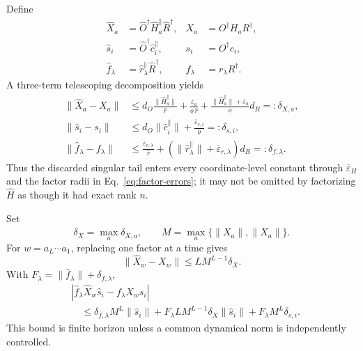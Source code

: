 \documentclass[aps,prl,onecolumn,superscriptaddress,nofootinbib]{revtex4-2}
\newcommand{\eps}{\varepsilon}
\begin{document}
Define
\begin{align}
 \widehat X_a&=\widehat O^\dagger\widehat H_a^{\parallel}\widehat R^\dagger,
 &X_a&=O^\dagger H_aR^\dagger,\nonumber\\
 \widehat s_i&=\widehat O^\dagger\widehat c_i^{\parallel},
 &s_i&=O^\dagger c_i,\nonumber\\
 \widehat f_\lambda&=\widehat r_\lambda^{\parallel}\widehat R^\dagger,
 &f_\lambda&=r_\lambda R^\dagger.
 \label{eq:truncated-reconstruction}
\end{align}
A three-term telescoping decomposition yields
\begin{align}
 \|\widehat X_a-X_a\|
 &\le d_O\frac{\|\widehat H_a^{\parallel}\|}{\widehat r}
 +\frac{\overline\eps_a}{\underline o\,\widehat r}
 +\frac{\|\widehat H_a^{\parallel}\|+\overline\eps_a}{\underline o}d_R
 =:\delta_{X,a},
 \label{eq:shift-error}\\
 \|\widehat s_i-s_i\|
 &\le d_O\|\widehat c_i^{\parallel}\|
 +\frac{\overline\eps_{c,i}}{\underline o}
 =:\delta_{s,i},
 \label{eq:seed-error}\\
 \|\widehat f_\lambda-f_\lambda\|
 &\le\frac{\overline\eps_{r,\lambda}}{\widehat r}
 +(\|\widehat r_\lambda^{\parallel}\|+\overline\eps_{r,\lambda})d_R
 =:\delta_{f,\lambda}.
 \label{eq:readout-error}
\end{align}
Thus the discarded singular tail enters every coordinate-level constant through $\overline\eps_H$ and the factor radii in Eq.~\eqref{eq:factor-errors}; it may not be omitted by factorizing $\widehat H$ as though it had exact rank $n$.

Set
\begin{equation}
 \delta_X=\max_a\delta_{X,a},
 \qquad
 M=\max_a\{\|X_a\|,\|\widehat X_a\|\}.
 \label{eq:MX}
\end{equation}
For $w=a_L\cdots a_1$, replacing one factor at a time gives
\begin{equation}
 \|\widehat X_w-X_w\|\le L M^{L-1}\delta_X.
 \label{eq:word-telescope}
\end{equation}
With $F_\lambda=\|\widehat f_\lambda\|+\delta_{f,\lambda}$,
\begin{align}
 &|\widehat f_\lambda\widehat X_w\widehat s_i-f_\lambda X_ws_i|\nonumber\\
 &\quad\le
 \delta_{f,\lambda}M^L\|\widehat s_i\|
 +F_\lambda L M^{L-1}\delta_X\|\widehat s_i\|
 +F_\lambda M^L\delta_{s,i}.
 \label{eq:prediction-bound}
\end{align}
This bound is finite horizon unless a common dynamical norm is independently controlled.
\end{document}
